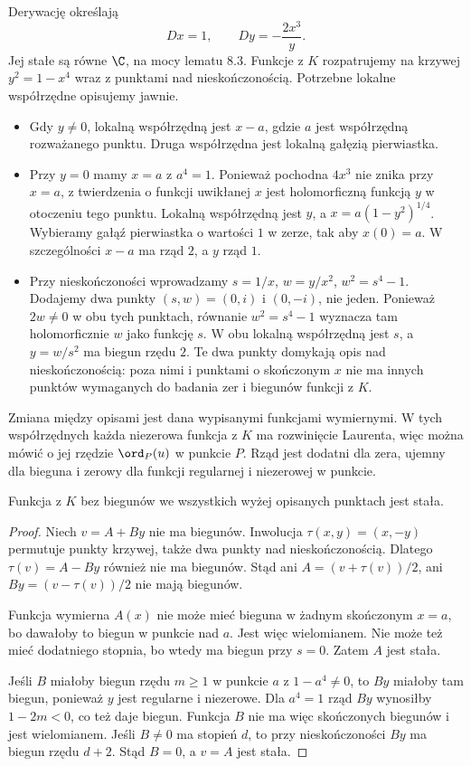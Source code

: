 Derywację określają
\[
Dx=1,\qquad Dy=-\frac{2x^3}{y}.
\]
Jej stałe są równe $\C$, na mocy lematu 8.3. Funkcje z $K$ rozpatrujemy na krzywej $y^2=1-x^4$ wraz z punktami nad nieskończonością. Potrzebne lokalne współrzędne opisujemy jawnie.
\begin{itemize}
\item Gdy $y\ne0$, lokalną współrzędną jest $x-a$, gdzie $a$ jest współrzędną rozważanego punktu. Druga współrzędna jest lokalną gałęzią pierwiastka.
\item Przy $y=0$ mamy $x=a$ z $a^4=1$. Ponieważ pochodna $4x^3$ nie znika przy $x=a$, z twierdzenia o funkcji uwikłanej $x$ jest holomorficzną funkcją $y$ w otoczeniu tego punktu. Lokalną współrzędną jest $y$, a $x=a(1-y^2)^{1/4}$. Wybieramy gałąź pierwiastka o wartości $1$ w zerze, tak aby $x(0)=a$. W szczególności $x-a$ ma rząd $2$, a $y$ rząd $1$.
\item Przy nieskończoności wprowadzamy $s=1/x$, $w=y/x^2$, $w^2=s^4-1$. Dodajemy dwa punkty $(s,w)=(0,i)$ i $(0,-i)$, nie jeden. Ponieważ $2w\ne0$ w obu tych punktach, równanie $w^2=s^4-1$ wyznacza tam holomorficznie $w$ jako funkcję $s$. W obu lokalną współrzędną jest $s$, a $y=w/s^2$ ma biegun rzędu $2$. Te dwa punkty domykają opis nad nieskończonością: poza nimi i punktami o skończonym $x$ nie ma innych punktów wymaganych do badania zer i biegunów funkcji z $K$.
\end{itemize}
Zmiana między opisami jest dana wypisanymi funkcjami wymiernymi. W tych współrzędnych każda niezerowa funkcja z $K$ ma rozwinięcie Laurenta, więc można mówić o jej rzędzie $\ord_P(u)$ w punkcie $P$. Rząd jest dodatni dla zera, ujemny dla bieguna i zerowy dla funkcji regularnej i niezerowej w punkcie.

\begin{lemat}
Funkcja z $K$ bez biegunów we wszystkich wyżej opisanych punktach jest stała.
\end{lemat}
\begin{proof}
Niech $v=A+By$ nie ma biegunów. Inwolucja $\tau(x,y)=(x,-y)$ permutuje punkty krzywej, także dwa punkty nad nieskończonością. Dlatego $\tau(v)=A-By$ również nie ma biegunów. Stąd ani $A=(v+\tau(v))/2$, ani $By=(v-\tau(v))/2$ nie mają biegunów.

Funkcja wymierna $A(x)$ nie może mieć bieguna w żadnym skończonym $x=a$, bo dawałoby to biegun w punkcie nad $a$. Jest więc wielomianem. Nie może też mieć dodatniego stopnia, bo wtedy ma biegun przy $s=0$. Zatem $A$ jest stała.

Jeśli $B$ miałoby biegun rzędu $m\ge1$ w punkcie $a$ z $1-a^4\ne0$, to $By$ miałoby tam biegun, ponieważ $y$ jest regularne i niezerowe. Dla $a^4=1$ rząd $By$ wynosiłby $1-2m<0$, co też daje biegun. Funkcja $B$ nie ma więc skończonych biegunów i jest wielomianem. Jeśli $B\ne0$ ma stopień $d$, to przy nieskończoności $By$ ma biegun rzędu $d+2$. Stąd $B=0$, a $v=A$ jest stała.
\end{proof}

